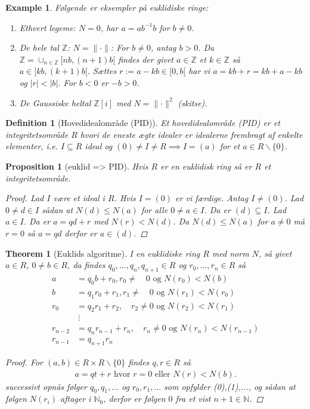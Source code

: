 \documentclass[10pt,twoside,openany,final]{memoir}
\theoremstyle{break}
\newtheorem{theorem}[section]{Theorem}
\newtheorem{proposition}[section]{Proposition}
\newtheorem{definition}[section]{Definition}
\theoremstyle{Break}
\newtheorem{example}[section]{Example}
\newcommand{\lv}{\lVert}
\newcommand{\rv}{\rVert}
\newcommand{\N}{\mathbb{N}}
\newcommand{\Z}{\mathbb{Z}}
\begin{document}
\begin{example}
Følgende er eksempler på euklidiske ringe:
\begin{enumerate}
\item Ethvert legeme: $N=0$, har $a=ab^{-1}b$ for $b \neq 0$.
\item De hele tal $\Z$: $N=\lv \cdot \rv$: For $b\neq 0$, antag $b>0$. Da $\Z=\cup_{n \in \Z} [nb,(n+1)b[$ findes der givet $a \in \Z$ et $k\in \Z$ så $a \in [kb,(k+1)b[$. Sættes $r:= a-kb\in [0,b[$ har vi $a=kb+r=kb+a-kb$ og $|r|<|b|$. For $b<0$ er $-b>0$. 
\item De Gaussiske heltal $\Z[i]$ med $N=\lv \cdot \rv^2$ (skitse).
\end{enumerate}
\end{example}

\begin{definition}[Hovedidealområde (PID)]
Et hovedidealområde (PID) er et integritetsområde $R$ hvori de eneste ægte idealer er idealerne frembragt af enkelte elementer, i.e. $I\subseteq R$ ideal og $(0)\neq I\neq R \implies I=(a)$ for et $a \in R\backslash\{0\}$. 
\end{definition}

\begin{proposition}[euklid => PID]
Hvis $R$ er en euklidisk ring så er $R$ et integritetsområde.
\begin{proof}
Lad $I$ være et ideal i $R$. Hvis $I=(0)$ er vi færdige. Antag $I \neq (0)$. Lad $0\neq d\in I$ sådan at $N(d)\leq N(a)$ for alle $0 \neq a \in I$. Da er $(d) \subseteq I$. Lad $a \in I$. Da er $a=qd+r$ med $N(r) < N(d)$. Da $N(d) \leq N(a)$ for $a \neq 0$ må $r=0$ så $a=qd$ derfor er $a \in (d)$. 
\end{proof}
\end{proposition}


\begin{theorem}[Euklids algoritme]
I en euklidiske ring $R$ med norm $N$, så givet $a \in R$, $0 \neq b \in R$, da findes $q_0,\dots,q_n,q_{n+1} \in R$ og $r_0,\dots,r_n \in R$ så
\begin{align*}
a&=q_0 b + r_0,  r_0 \neq \quad 0 \text{ og } N(r_0) < N(b) \tag{0}\\ 
b&=q_1 r_0 + r_1,  r_1 \neq \quad 0 \text{ og } N(r_1) < N(r_0)\tag{1}\\
r_0&=q_2 r_1 + r_2, \quad r_2 \neq 0 \text{ og } N(r_2) < N(r_1)\tag{2}\\
&\ \vdots\\
r_{n-2}&=q_n r_{n-1} + r_n, \quad r_n \neq 0 \text{ og } N(r_n) < N(r_{n-1}) \tag{n}\\
r_{n-1}&=q_{n+1}r_n \tag{n+1}
\end{align*}
\begin{proof}
For $(a,b) \in R \times R\backslash\{0\}$ findes $q,r \in R$ så 
\begin{align*}
a=qt+r \text{ hvor } r=0 \text{ eller } N(r) < N(b).
\end{align*}
successivt opnås følger $q_0,q_1,\dots$ og $r_0, r_1,\dots$ som opfylder (0),(1),..., og sådan at følgen $N(r_i)$ aftager i $\N_0$, derfor er følgen $0$ fra et vist $n+1 \in \N$.
\end{proof}
\end{theorem}
\end{document}
